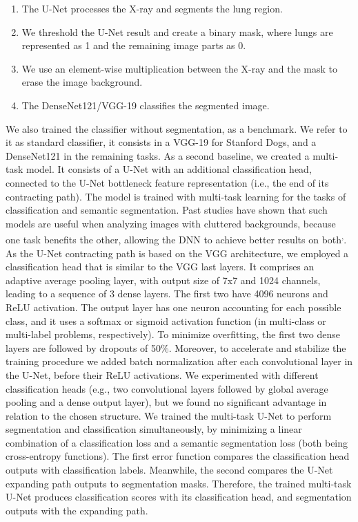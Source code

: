 \documentclass[fleqn,10pt]{wlscirep}
\begin{document}
{\begin{enumerate}
\item The U-Net processes the X-ray and segments the lung region.
\item We threshold the U-Net result and create a binary mask, where lungs are represented as 1 and the remaining image parts as 0. 
\item We use an element-wise multiplication between the X-ray and the mask to erase the image background.
\item The DenseNet121/VGG-19 classifies the segmented image.
\end{enumerate}

We also trained the classifier without segmentation, as a benchmark. We refer to it as standard classifier, it consists in a VGG-19 for Stanford Dogs, and a DenseNet121 in the remaining tasks. As a second baseline, we created a multi-task model. It consists of a U-Net with an additional classification head, connected to the U-Net bottleneck feature representation (i.e., the end of its contracting path). The model is trained with multi-task learning for the tasks of classification and semantic segmentation. Past studies have shown that such models are useful when analyzing images with cluttered backgrounds, because one task benefits the other, allowing the DNN to achieve better results on both\cite{MultiTask1}\textsuperscript{,}\cite{MultiTask2}. As the U-Net contracting path is based on the VGG architecture\cite{vggOriginal}, we employed a classification head that is similar to the VGG last layers. It comprises an adaptive average pooling layer, with output size of 7x7 and 1024 channels, leading to a sequence of 3 dense layers. The first two have 4096 neurons and ReLU activation. The output layer has one neuron accounting for each possible class, and it uses a softmax or sigmoid activation function (in multi-class or multi-label problems, respectively). To minimize overfitting, the first two dense layers are followed by dropouts of 50\%. Moreover, to accelerate and stabilize the training procedure we added batch normalization after each convolutional layer in the U-Net, before their ReLU activations. We experimented with different classification heads (e.g., two convolutional layers followed by global average pooling and a dense output layer), but we found no significant advantage in relation to the chosen structure. We trained the multi-task U-Net to perform segmentation and classification simultaneously, by minimizing a linear combination of a classification loss and a semantic segmentation loss (both being cross-entropy functions). The first error function compares the classification head outputs with classification labels. Meanwhile, the second compares the U-Net expanding path outputs to segmentation masks. Therefore, the trained multi-task U-Net produces classification scores with its classification head, and segmentation outputs with the expanding path.

}
\end{document}
